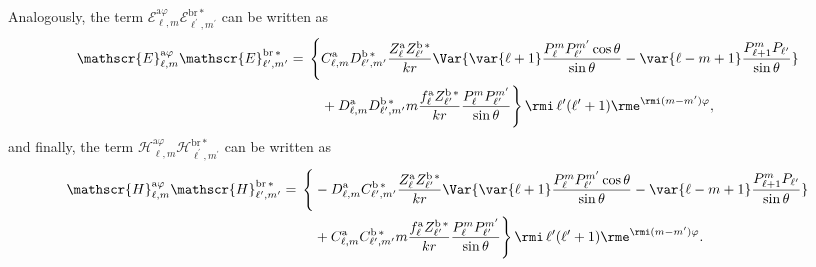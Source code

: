 %
Analogously, the term $\mathscr{E}_{\ell, m}^{\text{a}\varphi}\mathscr{E}_{\ell^{\prime}, m^{\prime}}^{\text{br}\,*}$ can be written as
%
\begin{align}
\mathscr{E}_{\ell, m}^{\text{a}\varphi}\mathscr{E}_{\ell^{\prime}, m^{\prime}}^{\text{br}\,*} = \, \Bigg\{& C_{\ell, m}^{\rm a} D_{\ell^{\prime}, m^{\prime}}^{\rm b \, *} \frac{Z_{\ell}^{\rm a} Z_{\ell^{\prime}}^{\rm b \, *}}{k r} \Var{\var{\ell +1} \frac{P_{\ell}^{m} P_{\ell^{\prime}}^{m^{\prime}}\cos\theta}{\sin\theta} -\var{\ell - m +1}\frac{P_{\ell+1}^m P_{\ell^{\prime}}}{\sin\theta} }\nonumber\\
& + D_{\ell, m}^{\rm a} D_{\ell^{\prime}, m^{\prime}}^{\rm b \, *} m \frac{f_{\ell}^{\rm a} Z_{\ell^{\prime}}^{\rm b\, *}}{k r} \frac{P_{\ell}^{m} P_{\ell^{\prime}}^{m^{\prime}}}{\sin\theta} \Bigg\} \, \rmi \, \ell^{\prime}(\ell^{\prime}+1)  \rme^{\rmi (m-m^{\prime})\varphi },
\end{align}
%
and finally, the term $\mathscr{H}_{\ell, m}^{\text{a}\varphi}\mathscr{H}_{\ell^{\prime}, m^{\prime}}^{\text{br}\,*}$ can be written as
%
\begin{align}
\mathscr{H}_{\ell, m}^{\text{a}\varphi}\mathscr{H}_{\ell^{\prime}, m^{\prime}}^{\text{br}\,*} = \, \Bigg\{& -D_{\ell, m}^{\rm a} C_{\ell^{\prime}, m^{\prime}}^{\rm b \, *} \frac{Z_{\ell}^{\rm a} Z_{\ell^{\prime}}^{\rm b \, *}}{k r} \Var{\var{\ell +1} \frac{P_{\ell}^{m} P_{\ell^{\prime}}^{m^{\prime}}\cos\theta}{\sin\theta} -\var{\ell - m +1}\frac{P_{\ell+1}^m P_{\ell^{\prime}}}{\sin\theta} }\nonumber\\
& + C_{\ell, m}^{\rm a} C_{\ell^{\prime}, m^{\prime}}^{\rm b \, *} m \frac{f_{\ell}^{\rm a} Z_{\ell^{\prime}}^{\rm b\, *}}{k r} \frac{P_{\ell}^{m} P_{\ell^{\prime}}^{m^{\prime}}}{\sin\theta} \Bigg\} \, \rmi \, \ell^{\prime}(\ell^{\prime}+1)  \rme^{\rmi (m-m^{\prime})\varphi }.
\end{align}

